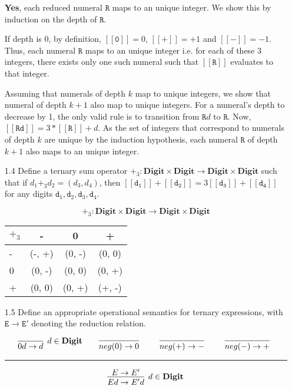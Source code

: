 \documentclass[a4paper,10pt]{article}
\newcommand{\E}{\mathtt{E}}
\newcommand{\R}{\mathtt{R}}
\newcommand{\digit}{\mathtt{d}}
\newcommand{\Digit}{\mathbf{Digit}}
\newcommand{\denot}[1]{\mathtt{[[{#1}]]}}
\newcommand{\question}[1]
{\color{DarkBlue}#1 \color{Black} \newline}
\begin{document}
\begin{enumerate}
\textbf{Yes}, each reduced numeral $\R$ maps to an unique integer. We show this
by induction on the depth of $\R$.

\proof
If depth is 0, by definition, $\denot{0} = 0$, $\denot{+} = +1$ and
$\denot{-} = -1$. Thus, each numeral $\R$ maps to an unique integer i.e.
for each of these 3 integers, there exists only one such numeral such that
$\denot{\R}$ evaluates to that integer.

Assuming that numerals of depth $k$ map to unique integers, we show
that numeral of depth $k+1$ also map to unique integers.
For a numeral's depth to decrease by 1, the only valid rule is
to transition from $\R d$ to $\R$. Now, $\denot{\R d} = 3 * \denot{\R} + d$.
As the set of integers that correspond to numerals of depth $k$ are unique
by the induction hypothesis, 
each numeral $\R$ of depth $k+1$ also maps to an unique integer.


\question{
\item[1.4] Define a ternary sum operator $+_3 : \Digit \times \Digit \to \Digit \times \Digit$ 
such that if $d_1 +_3 d_2 = (d_3,d_4)$, then $\denot{\digit_1} + \denot{\digit_2} = 3
\denot{\digit_3} + \denot{\digit_4}$ for any digits $\digit_1, \digit_2, \digit_3, \digit_4$.
}

\begin{table}[h!]
    \centering
	
	$$ +_3 : \Digit \times \Digit \to \Digit \times \Digit$$ 

	\begin{tabular}{l | c c c}
	$+_3$ & - & 0 & + \\
	\hline
	- & (-, +) & (0, -) & (0, 0) \\
	0 & (0, -) & (0, 0) & (0, +) \\
	+ & (0, 0) & (0, +) & (+, -) \\
	\end{tabular}
\end{table}

\question{
\item[1.5] Define an appropriate operational semantics for ternary expressions, 
with $\E \to \E'$ denoting the reduction relation.
}

\[
\infer[d \in \Digit]
  {0d \rightarrow d}
  {}   
\qquad
\infer[] 
  {neg(0) \rightarrow 0}  
  {}    
\qquad
\infer[] 
  {neg(+) \rightarrow -}  
  {}    
\qquad
\infer[] 
  {neg(-) \rightarrow +}  
  {}    
\]

\hrule

\[
\infer[d \in \Digit]
  {Ed \rightarrow E'd}
  {E \rightarrow E'}
\]


\end{enumerate}
\end{document}
